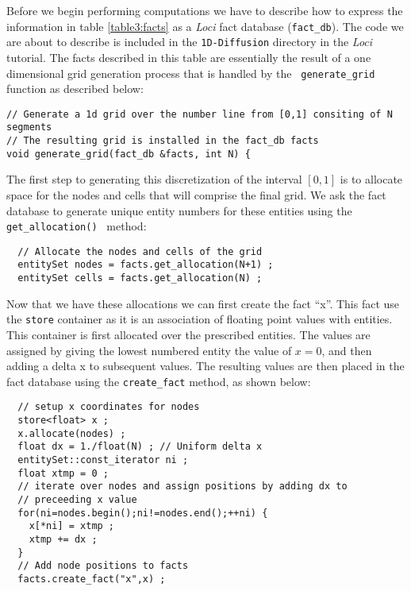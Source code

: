 \documentclass[10pt,epsf]{book}
\begin{document}
Before we begin performing computations we have to describe how to
express the information in table \ref{table3:facts} as a {\it Loci} fact
database ({\tt fact\_db}).  The code we are about to describe is
included in the {\tt 1D-Diffusion} directory in the {\it Loci} tutorial.
The facts described in this table are essentially the result of a one
dimensional grid generation process that is handled by the {\tt
  generate\_grid} function as described below:
\begin{verbatim}
// Generate a 1d grid over the number line from [0,1] consiting of N segments
// The resulting grid is installed in the fact_db facts 
void generate_grid(fact_db &facts, int N) {
\end{verbatim}
The first step to generating this discretization of the interval
$[0,1]$ is to allocate space for the nodes and cells that will
comprise the final grid.  We ask the fact database to generate unique
entity numbers for these entities using the {\tt get\_allocation() }
method:
\begin{verbatim}
  // Allocate the nodes and cells of the grid
  entitySet nodes = facts.get_allocation(N+1) ;
  entitySet cells = facts.get_allocation(N) ;
\end{verbatim}
Now that we have these allocations we can first create the fact
``x''.  This fact use the {\tt store} container as it is an
association of floating point values with entities.  This container is
first allocated over the prescribed entities.  The values are assigned
by giving the lowest numbered entity the value of $x=0$, and then
adding a delta x to subsequent values.  The resulting values are then
placed in the fact database using the {\tt create\_fact} method, as
shown below:
\begin{verbatim}
  // setup x coordinates for nodes
  store<float> x ;
  x.allocate(nodes) ;
  float dx = 1./float(N) ; // Uniform delta x
  entitySet::const_iterator ni ;
  float xtmp = 0 ;
  // iterate over nodes and assign positions by adding dx to
  // preceeding x value
  for(ni=nodes.begin();ni!=nodes.end();++ni) {
    x[*ni] = xtmp ;
    xtmp += dx ;
  }
  // Add node positions to facts
  facts.create_fact("x",x) ;
\end{verbatim}
\end{document}
